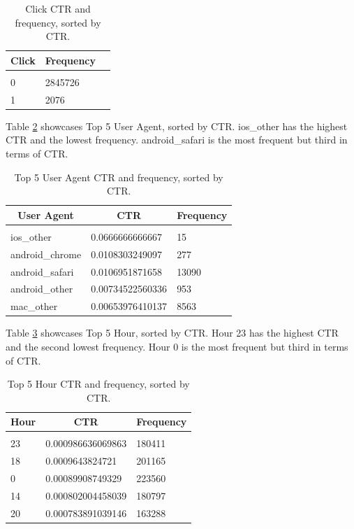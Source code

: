 \documentclass{article} %
\begin{document}
\begin{table}[!htbp]
\caption{Click CTR and frequency, sorted by CTR.}
\label{table:1}
\begin{center}
\begin{tabular}{l l l}
\multicolumn{1}{c}{\bf Click} & \multicolumn{1}{c}{\bf Frequency}
\\ \hline \\
0 & 2845726\\
1 & 2076\\
\end{tabular}
\end{center}
\end{table}

Table \ref{table:2} showcases Top 5 User Agent, sorted by CTR. ios\_other has the highest CTR and the lowest frequency. android\_safari is the most frequent but third in terms of CTR.

\begin{table}[!htbp]
\caption{Top 5 User Agent CTR and frequency, sorted by CTR.}
\label{table:2}
\begin{center}
\begin{tabular}{l l l}
\multicolumn{1}{c}{\bf User Agent} & \multicolumn{1}{c}{\bf CTR} & \multicolumn{1}{c}{\bf Frequency}
\\ \hline \\
ios\_other      & 0.0666666666667  & 15\\
android\_chrome & 0.0108303249097  & 277\\
android\_safari & 0.0106951871658  & 13090\\
android\_other  & 0.00734522560336 & 953\\
mac\_other      & 0.00653976410137 & 8563\\
\end{tabular}
\end{center}
\end{table}

Table \ref{table:3} showcases Top 5 Hour, sorted by CTR. Hour 23 has the highest CTR and the second lowest frequency. Hour 0 is the most frequent but third in terms of CTR.

\clearpage

\begin{table}[!htbp]
\caption{Top 5 Hour CTR and frequency, sorted by CTR.}
\label{table:3}
\begin{center}
\begin{tabular}{l l l}
\multicolumn{1}{c}{\bf Hour} & \multicolumn{1}{c}{\bf CTR} & \multicolumn{1}{c}{\bf Frequency}
\\ \hline \\
23 & 0.000986636069863 & 180411\\
18 & 0.0009643824721   & 201165\\
0  & 0.00089908749329  & 223560\\
14 & 0.000802004458039 & 180797\\
20 & 0.000783891039146 & 163288\\
\end{tabular}
\end{center}
\end{table}
\end{document}
